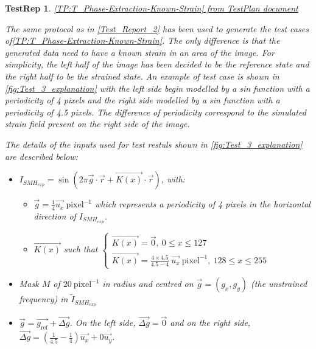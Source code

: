 \documentclass[12pt, titlepage]{article}
\newtheorem{TestRep}{TestRep}
\begin{document}
\begin{TestRep}\normalfont\underline{{\cref{TP:T_Phase-Extraction-Known-Strain}} from TestPlan document} \label{Test_Report_3} \newline

The same protocol as in \cref{Test_Report_2} has been used to generate the test cases of\cref{TP:T_Phase-Extraction-Known-Strain}. The only difference is that the generated data need to have a known strain in an area of the image. For simplicity, the left half of the image has been decided to be the reference state and the right half to be the strained state. An example of test case is shown in \cref{fig:Test_3_explanation} with the left side begin modelled by a sin function with a periodicity of 4 pixels and the right side modelled by a sin function with a periodicity of 4.5 pixels. The difference of periodicity correspond to the simulated strain field present on the right side of the image.\medskip

The details of the inputs used for test restuls shown in \cref{fig:Test_3_explanation} are  described below:
\begin{itemize}
\item $I_{SMH_{exp}}=\sin{(2\pi \overrightarrow{g}\cdot\overrightarrow{r} + \overrightarrow{K(x)}\cdot\overrightarrow{r})}$, with:
	\begin{itemize}
	\item $\overrightarrow{g} = \frac{1}{4} \overrightarrow{u_x} \ \text{pixel}^{-1}$ which represents a periodicity of 4 pixels in the horizontal direction of $I_{SMH_{exp}}$.
	\item $\overrightarrow{K(x)}$ such that $\begin{cases}
	\overrightarrow{K(x)}=\overrightarrow{0}, \ 0\leq x\leq127 \\
	\overrightarrow{K(x)}=\frac{4\times4.5}{4.5-4} \ \overrightarrow{u_x} \ \text{pixel}^{-1}, \ 128\leq x\leq 255
	\end{cases}$
	\end{itemize}
\item Mask $M$ of $20 \ \text{pixel}^{-1}$ in radius and centred on $\overrightarrow{g}=(g_x,g_y)$ (the unstrained frequency) in $\widetilde{I}_{SMH_{exp}}$
\item $\overrightarrow{g} = \overrightarrow{g_\text{ref}} + \overrightarrow{\Delta g}$. On the left side, $\overrightarrow{\Delta g} = \overrightarrow{0}$ and on the right side, $\overrightarrow{\Delta g} = (\frac{1}{4.5}-\frac{1}{4})\overrightarrow{u_x} + 0 \overrightarrow{u_y}$.
\end{itemize}


\end{TestRep}
\end{document}
